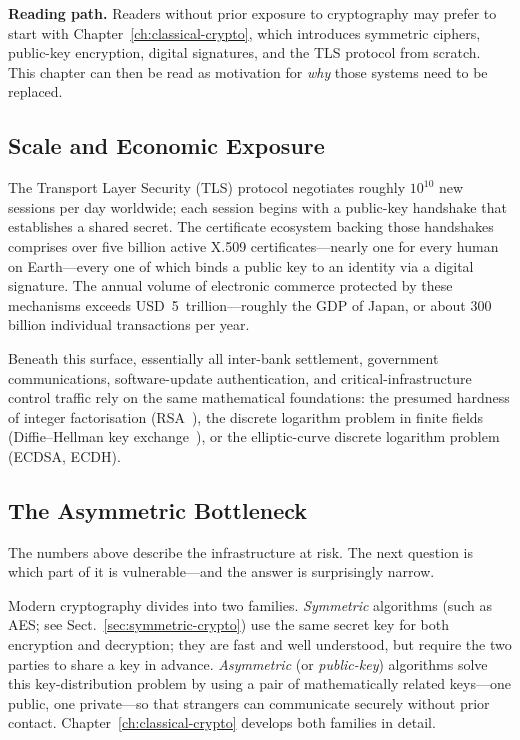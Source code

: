 \begin{svgraybox}
\textbf{Reading path.}  Readers without prior exposure to cryptography may prefer to start with Chapter~\ref{ch:classical-crypto}, which introduces symmetric ciphers, public-key encryption, digital signatures, and the TLS protocol from scratch.  This chapter can then be read as motivation for \emph{why} those systems need to be replaced.
\end{svgraybox}

\subsection{Scale and Economic Exposure}

The Transport Layer Security (TLS) protocol negotiates roughly $10^{10}$ new sessions per day worldwide; each session begins with a public-key handshake that establishes a shared secret.  The certificate ecosystem backing those handshakes comprises over five billion active X.509 certificates---nearly one for every human on Earth---every one of which binds a public key to an identity via a digital signature.  The annual volume of electronic commerce protected by these mechanisms exceeds USD~5~trillion---roughly the GDP of Japan, or about 300 billion individual transactions per year.

Beneath this surface, essentially all inter-bank settlement, government communications, software-update authentication, and critical-infrastructure control traffic rely on the same mathematical foundations: the presumed hardness of integer factorisation (RSA~\cite{RSA1978}), the discrete logarithm problem in finite fields (Diffie--Hellman key exchange~\cite{DiffieHellman1976}), or the elliptic-curve discrete logarithm problem (ECDSA, ECDH).

\subsection{The Asymmetric Bottleneck}

The numbers above describe the infrastructure at risk.  The next question is which part of it is vulnerable---and the answer is surprisingly narrow.

Modern cryptography divides into two families.  \emph{Symmetric} algorithms (such as AES; see Sect.~\ref{sec:symmetric-crypto}) use the same secret key for both encryption and decryption; they are fast and well understood, but require the two parties to share a key in advance.  \emph{Asymmetric} (or \emph{public-key}) algorithms solve this key-distribution problem by using a pair of mathematically related keys---one public, one private---so that strangers can communicate securely without prior contact.  Chapter~\ref{ch:classical-crypto} develops both families in detail.

